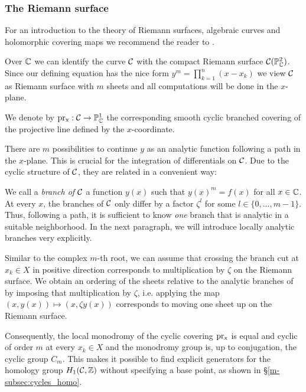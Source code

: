 \documentclass[main.tex]{subfiles}
\begin{document}
  \subsubsection{The Riemann surface}\label{subsec:riemann_surface}
  
  For an introduction to the theory of Riemann surfaces, algebraic curves and holomorphic covering maps we recommend the reader
  to \cite{Miranda1995}.
  
  
  
   Over $\mathbb{C}$ we can identify the curve $\mathcal{C}$ with the compact Riemann surface $\mathcal{C}(\mathbb{P}^2_{\mathbb{C}})$. Since our defining equation
   has the nice form
   $y^m = \prod_{k = 1}^n (x - x_k)$ we view $\mathcal{C}$ as Riemann surface with $m$ sheets and 
   all computations will be done in the $x$-plane.
   
   We denote by $\operatorname{pr_x} : \mathcal{C} \rightarrow \mathbb{P}^1_{\mathbb{C}}$ the corresponding smooth cyclic branched covering of the projective line
   defined by the $x$-coordinate. 
   
  There
  are $m$ possibilities to continue $y$ as an analytic function following a path in the $x$-plane. This is crucial for the integration
  of differentials on $\mathcal{C}$. Due to the cyclic structure of $\mathcal{C}$, they are related in a convenient way:
  
  We call a \emph{branch of $\mathcal{C}$} a function $y(x)$ such that
  $y(x)^m = f(x)$ for all $x \in \mathbb{C}$. At every $x$, the branches of $\mathcal{C}$ only
  differ by a factor $\zeta^l$ for some $l \in \{0,\dots,m-1\}$. Thus, following a path, it is sufficient to know \emph{one} branch that is analytic in a suitable neighborhood. In the
  next paragraph, we will introduce locally analytic branches very explicitly.
  
  \bigskip
  
  Similar to the complex $m$-th root, we can assume that crossing the branch cut at $x_k \in X$ in positive direction corresponds to multiplication by $\zeta$ on the Riemann surface. We
  obtain an ordering of the sheets relative to the analytic branches of by imposing that multiplication by $\zeta$, i.e. applying the map
  $(x,y(x)) \mapsto (x,\zeta y(x))$ corresponds to moving one sheet up on the Riemann surface.
  
   \bigskip
  
  
  Consequently, the local monodromy of the cyclic covering $\operatorname{pr_x}$  is equal and cyclic of order $m$ at every $x_k \in X$
 and the monodromy group is, up to conjugation, the cyclic group $C_m$. This makes it possible to find explicit generators for the
  homology group $H_1(\mathcal{C},\mathbb{Z})$ without specifying a base point, as shown in \S \ref{m-subsec:cycles_homo}.
\end{document}
